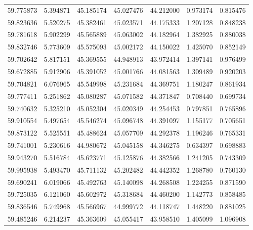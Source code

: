 \begin{tabular}{rrrrrrr}
 59.775873 &   5.394871 &         45.185174 &         45.027476 &         44.212000 &  0.973174 &  0.815476 \\
 59.823636 &   5.520275 &         45.382461 &         45.023571 &         44.175333 &  1.207128 &  0.848238 \\
 59.781618 &   5.902299 &         45.565889 &         45.063002 &         44.182964 &  1.382925 &  0.880038 \\
 59.832746 &   5.773609 &         45.575093 &         45.002172 &         44.150022 &  1.425070 &  0.852149 \\
 59.702642 &   5.817151 &         45.369555 &         44.948913 &         43.972414 &  1.397141 &  0.976499 \\
 59.672885 &   5.912906 &         45.391052 &         45.001766 &         44.081563 &  1.309489 &  0.920203 \\
 59.704821 &   6.076965 &         45.549998 &         45.231684 &         44.369751 &  1.180247 &  0.861934 \\
 59.777411 &   5.251862 &         45.080287 &         45.071582 &         44.371847 &  0.708440 &  0.699734 \\
 59.740632 &   5.325210 &         45.052304 &         45.020349 &         44.254453 &  0.797851 &  0.765896 \\
 59.910554 &   5.497654 &         45.546274 &         45.096748 &         44.391097 &  1.155177 &  0.705651 \\
 59.873122 &   5.525551 &         45.488624 &         45.057709 &         44.292378 &  1.196246 &  0.765331 \\
 59.741001 &   5.230616 &         44.980672 &         45.045158 &         44.346275 &  0.634397 &  0.698883 \\
 59.943270 &   5.516784 &         45.623771 &         45.125876 &         44.382566 &  1.241205 &  0.743309 \\
 59.995938 &   5.493470 &         45.711132 &         45.202482 &         44.442352 &  1.268780 &  0.760130 \\
 59.690241 &   6.019066 &         45.492763 &         45.140098 &         44.268508 &  1.224255 &  0.871590 \\
 59.725035 &   6.121060 &         45.602972 &         45.318684 &         44.460200 &  1.142773 &  0.858485 \\
 59.836546 &   5.749968 &         45.566967 &         44.999772 &         44.118747 &  1.448220 &  0.881025 \\
 59.485246 &   6.214237 &         45.363609 &         45.055417 &         43.958510 &  1.405099 &  1.096908 \\

\end{tabular}
